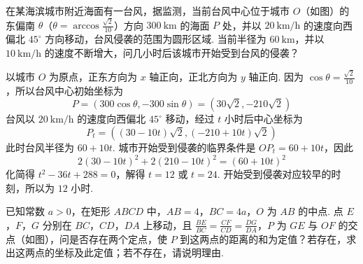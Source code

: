 \begin{problem}
在某海滨城市附近海面有一台风，据监测，当前台风中心位于城市 \(O\)（如图）的东偏南 \(\theta\)（\(\theta = \arccos \frac{\sqrt{2}}{10}\)）方向 \(300\mathrm{~km}\) 的海面 \(P\) 处，并以 \(20\mathrm{~km}/\mathrm{h}\) 的速度向西偏北 \(45^{\circ}\) 方向移动，台风侵袭的范围为圆形区域. 当前半径为 \(60\mathrm{~km}\)，并以 \(10\mathrm{~km}/\mathrm{h}\) 的速度不断增大，问几小时后该城市开始受到台风的侵袭？

\FloatBarrier
\end{problem}

\begin{solution}
以城市 \(O\) 为原点，正东方向为 \(x\) 轴正向，正北方向为 \(y\) 轴正向. 因为 \(\cos\theta=\frac{\sqrt2}{10}\)，所以台风中心初始坐标为
\[
P=(300\cos\theta,-300\sin\theta)=(30\sqrt2,-210\sqrt2)
\]
台风以 \(20\mathrm{~km}/\mathrm h\) 的速度向西偏北 \(45^{\circ}\) 移动，经过 \(t\) 小时后中心坐标为
\[
P_t=((30-10t)\sqrt2,(-210+10t)\sqrt2)
\]
此时台风半径为 \(60+10t\). 城市开始受到侵袭的临界条件是 \(OP_t=60+10t\)，因此
\[
2(30-10t)^2+2(210-10t)^2=(60+10t)^2
\]
化简得 \(t^2-36t+288=0\)，解得 \(t=12\) 或 \(t=24\). 开始受到侵袭对应较早的时刻，所以为 \(12\) 小时.
\end{solution}

\begin{problem}
已知常数 \(a > 0\)，在矩形 \(ABCD\) 中，\(AB = 4\)，\(BC = 4a\)，\(O\) 为 \(AB\) 的中点. 点 \(E\)，\(F\)，\(G\) 分别在 \(BC\)，\(CD\)，\(DA\) 上移动，且 \(\frac{BE}{BC} = \frac{CF}{CD} = \frac{DG}{DA}\)，\(P\) 为 \(GE\) 与 \(OF\) 的交点（如图），问是否存在两个定点，使 \(P\) 到这两点的距离的和为定值？若存在，求出这两点的坐标及此定值；若不存在，请说明理由.

\FloatBarrier
\end{problem}

